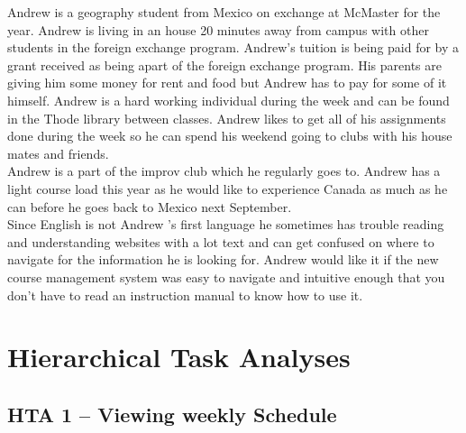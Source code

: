 \documentclass[12pt]{article}
\begin{document}
Andrew is a geography student from Mexico on exchange at McMaster for the year. Andrew is living in an house 20 minutes away from campus with other students in the foreign exchange program. Andrew's tuition is being paid for by a grant received as being apart of the foreign exchange program. His parents are giving him some money for rent and food but Andrew has to pay for some of it himself. Andrew is a hard working individual during the week and can be found in the Thode library between classes. Andrew likes to get all of his assignments done during the week so he can spend his weekend going to clubs with his house mates and friends.\\

Andrew is a part of the improv club which he regularly goes to. Andrew has a light course load this year as he would like to experience Canada as much as he can before he goes back to Mexico next September.\\

Since English is not Andrew 's first language he sometimes has trouble reading and understanding websites with a lot text and can get confused on where to navigate for the information he is looking for. Andrew would like it if the new course management system was easy to navigate and intuitive enough that you don't have to read an instruction manual to know how to use it.

\newpage
\section{Hierarchical Task Analyses}\vspace{3mm}
\subsection{HTA 1 -- Viewing weekly Schedule}
\vspace{4mm}
\begin{center}
\end{center}
\end{document}
